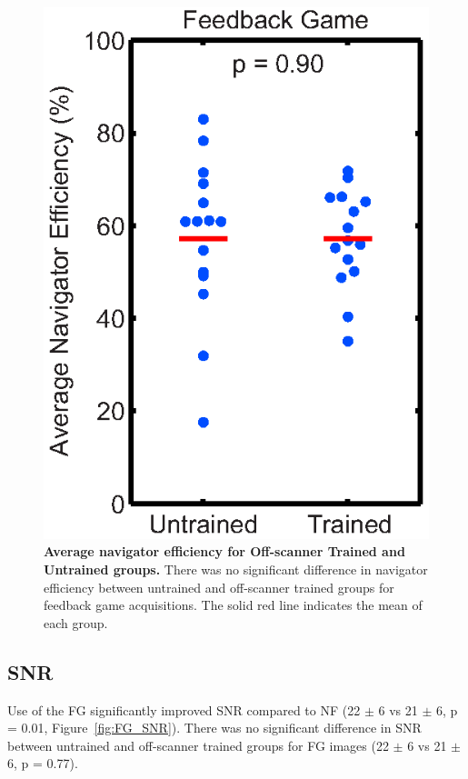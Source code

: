 	\begin{figure}
		\centering %
		\includegraphics{figures/gamepaper/04-navEffAveFG_UvsT}
		\caption[Average navigator efficiency for Off-scanner Trained and Untrained groups]{\textbf{Average navigator efficiency for Off-scanner Trained and Untrained groups.} There was no significant difference in navigator efficiency between untrained and off-scanner trained groups for feedback game acquisitions. The solid red line indicates the mean of each group.}
		\label{fig:navEff_TvsUT}
	\end{figure}

\subsection{SNR}
	Use of the FG significantly improved SNR compared to NF (22 $\pm$ 6 vs 21 $\pm$ 6, p = 0.01, Figure~\ref{fig:FG_SNR}). There was no significant difference in SNR between untrained and off-scanner trained groups for FG images (22 $\pm$ 6 vs 21 $\pm$ 6, p = 0.77).
	
